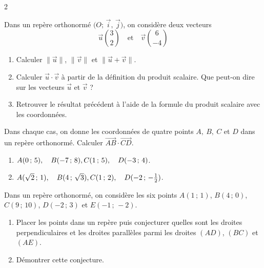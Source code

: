 \documentclass[a4paper,12pt]{article}
\begin{document}
\begin{multicols}{2}
  \begin{exercice}[title=Exercice 5 $\star$ { [Calculer] }]{}{}
    Dans un repère orthonormé \(\bigl(O;\,\vec{i},\,\vec{j}\bigr)\), on considère deux vecteurs
    \[
      \vec{u}\binom{3}{2}
      \quad\text{et}\quad
      \vec{v}\binom{6}{-4}
    \]
    \begin{enumerate}
      \item Calculer \(\|\vec{u}\|\), \(\|\vec{v}\|\) et \(\|\vec{u} + \vec{v}\|\).
      \item Calculer \(\vec{u}\cdot\vec{v}\) à partir de la définition du produit scalaire. Que peut-on dire sur les vecteurs \(\vec{u}\) et \(\vec{v}\) ?
      \item Retrouver le résultat précédent à l'aide de la formule du produit scalaire avec les coordonnées.
    \end{enumerate}
  \end{exercice}

  \begin{exercice}[title=Exercice 6 $\star$ { [Calculer] }]{}{}
    Dans chaque cas, on donne les coordonnées de quatre points \(A,\ B,\ C\) et \(D\) dans un repère orthonormé. Calculer \(\overrightarrow{AB} \cdot \overrightarrow{CD}\).
    \begin{enumerate}
      \item
        \(A(0\,;\,5),\quad B(-7\,;\,8),\\ C(1\,;\,5),\quad D(-3\,;\,4)\).
      \item
        \(A(\sqrt{2}\,;\,1),\quad B(4\,;\,\sqrt{3}),\\ C(1\,;\,2),\quad D(-2\,;\,-\tfrac{1}{2})\).
    \end{enumerate}
  \end{exercice}

  \begin{exercice}[title=Exercice 7 $\star\star$ { [Chercher, Calculer] }]{}{}
    Dans un repère orthonormé, on considère les six points
    $A(1\,;\,1)$, $B(4\,;\,0)$, $C(9\,;\,10)$, $D(-2\,;\,3)$ et $E(-1\,;\,-2)$.
    \begin{enumerate}
      \item Placer les points dans un repère puis conjecturer quelles sont les droites perpendiculaires et les droites parallèles parmi les droites \((AD)\), \((BC)\) et \((AE)\).
      \item Démontrer cette conjecture.
    \end{enumerate}
  \end{exercice}


\end{multicols}
\end{document}
